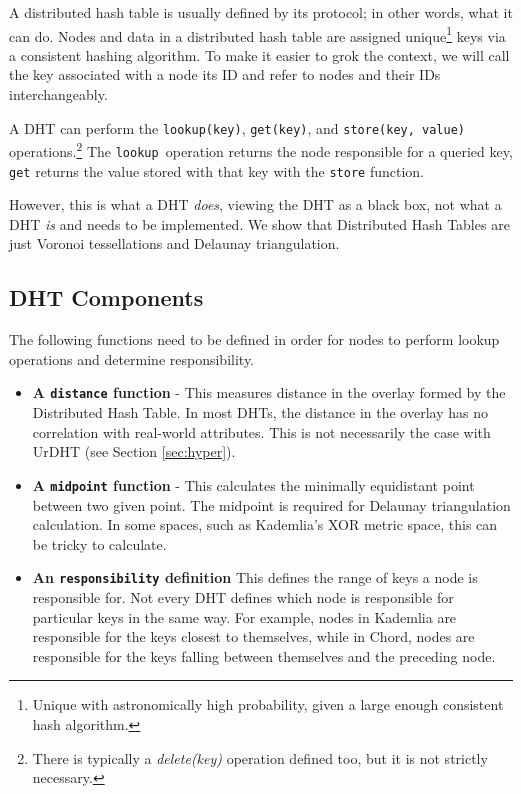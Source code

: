\documentclass[11pt,conference]{IEEEtran}
\begin{document}
A distributed hash table is usually defined by its protocol; in other words, what it can do.
Nodes and data in a distributed hash table are assigned unique\footnote{Unique with astronomically high probability, given a large enough consistent hash algorithm.} keys via a consistent hashing algorithm.
To make it easier to grok the context, we will call the key associated with a node its ID and refer to  nodes and their IDs interchangeably.

A DHT can perform the \texttt{lookup(key)}, \texttt{get(key)}, and \texttt{store(key, value)} operations.\footnote{There is typically a \textit{delete(key)} operation defined too, but it is not strictly necessary.}
The \texttt{lookup }operation returns the node responsible for a queried key, \texttt{get} returns the value stored with that key with the \texttt{store} function.

However, this is what a DHT \textit{does}, viewing the DHT as a black box, not what a DHT \textit{is} and needs to be implemented.
We show that Distributed Hash Tables are just Voronoi tessellations and Delaunay triangulation.


\subsection{DHT Components}
The following functions need to be defined in order for nodes to perform lookup operations and determine responsibility.

\begin{itemize}
	\item \textbf{A \texttt{distance} function } -
	This measures distance in the overlay formed by the Distributed Hash Table.
	In most DHTs, the distance in the overlay has no correlation with real-world attributes.
	This is not necessarily the case with UrDHT (see Section \ref{sec:hyper}).
	
	\item \textbf{A \texttt{midpoint} function} - This calculates the minimally equidistant point between two given point.
	The midpoint is required for Delaunay triangulation calculation.
	In some spaces, such as Kademlia's XOR metric space, this can be tricky to calculate.  %
	\item \textbf{An \texttt{responsibility} definition}  This defines the range of keys a node is responsible for. 
	Not every DHT defines which node is responsible for particular keys in the same way. 
	For example, nodes in Kademlia are responsible for the keys closest to themselves, while in Chord, nodes are responsible for the keys falling between themselves and the preceding node.
\end{itemize}
\end{document}
